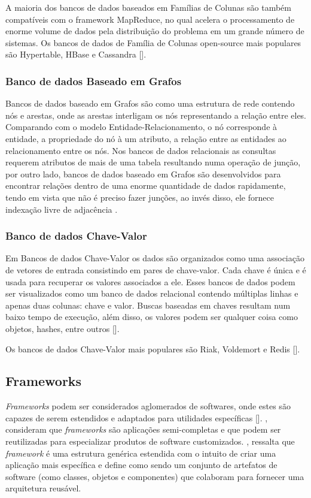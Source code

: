 A maioria dos bancos de dados baseados em Famílias de Colunas são também compatíveis com o framework MapReduce, no qual acelera o processamento de enorme volume de dados pela distribuição do problema em um grande número de sistemas. Os bancos de dados  de Família de Colunas open-source mais populares são Hypertable, HBase e Cassandra [\cite{kaur:2013}].

\subsubsection{Banco de dados Baseado em Grafos}

Bancos de dados baseado em Grafos são como uma estrutura de rede contendo nós e arestas, onde as arestas interligam os nós representando a relação entre eles. Comparando com o modelo Entidade-Relacionamento, o nó corresponde à entidade, a propriedade do nó à um atributo, a relação entre as entidades ao relacionamento entre os nós. Nos bancos de dados relacionais as consultas requerem atributos de mais de uma tabela resultando numa operação de junção, por outro lado, bancos de dados baseado em Grafos são desenvolvidos para encontrar relações dentro de uma enorme quantidade de dados rapidamente, tendo em vista que não é preciso fazer junções, ao invés disso, ele fornece indexação livre de adjacência \cite{kaur:2013}.

\subsubsection{Banco de dados Chave-Valor}

Em Bancos de dados Chave-Valor os dados são organizados como uma associação de vetores de entrada consistindo em pares de chave-valor. Cada chave é única e é usada para recuperar os valores associados a ele. Esses bancos de dados podem ser visualizados como um banco de dados relacional contendo múltiplas linhas e apenas duas colunas: chave e valor. Buscas baseadas em chaves resultam num baixo tempo de execução, além disso, os valores podem ser qualquer coisa como objetos, hashes, entre outros [\cite{kaur:2013}].

Os bancos de dados Chave-Valor mais populares são Riak, Voldemort e Redis [\cite{kaur:2013}].


\subsection{Frameworks}

\textit{Frameworks} podem ser considerados aglomerados de softwares, onde estes são capazes de serem estendidos e adaptados para utilidades específicas [\cite{taligent:1994}]. \cite{pree:1997}, consideram que  \textit{frameworks} são aplicações semi-completas e que podem ser reutilizadas para especializar produtos de software customizados. \cite{sommerville:2013}, ressalta que \textit{framework} é uma estrutura genérica estendida com o intuito de criar uma aplicação mais específica e \cite{schmidt:2004} define como sendo um conjunto de artefatos de software (como classes, objetos e componentes) que colaboram para fornecer uma arquitetura reusável.

